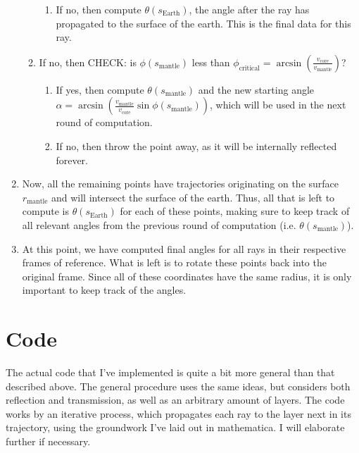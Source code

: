 \documentclass{article}
\newcommand*\te[1]{\text{#1}}
\newcommand*\p[1]{\left(#1\right)}
\newcommand*\f[2]{\frac{#1}{#2}}
\begin{document}
\begin{enumerate}
\begin{enumerate}
\begin{enumerate}
\item If no, then compute $\theta(s_{\te{Earth}})$, the angle after the ray has propagated to the surface of the earth. This is the final data for this ray.
\end{enumerate}
\item If no, then CHECK: is $\phi(s_{\te{mantle}})$ less than $\phi_{\te{critical}}=\arcsin\p{\f{v_{\te{core}}}{v_{\te{mantle}}}}$?
\begin{enumerate}
\item If yes, then compute $\theta(s_{\te{mantle}})$ and the new starting angle $\alpha=\arcsin\p{\f{v_{\te{mantle}}}{v_{\te{core}}}\sin\phi(s_{\te{mantle}})}$, which will be used in the next round of computation.
\item If no, then throw the point away, as it will be internally reflected forever.
\end{enumerate}
\end{enumerate}
\item Now, all the remaining points have trajectories originating on the surface $r_{\te{mantle}}$ and will intersect the surface of the earth. Thus, all that is left to compute is $\theta(s_{\te{Earth}})$ for each of these points, making sure to keep track of all relevant angles from the previous round of computation (i.e. $\theta(s_{\te{mantle}})$).
\item At this point, we have computed final angles for all rays in their respective frames of reference. What is left is to rotate these points back into the original frame. Since all of these coordinates have the same radius, it is only important to keep track of the angles.
\end{enumerate}
\pagebreak
\section{Code}
The actual code that I've implemented is quite a bit more general than that described above. The general procedure uses the same ideas, but considers both reflection and transmission, as well as an arbitrary amount of layers. The code works by an iterative process, which propagates each ray to the layer next in its trajectory, using the groundwork I've laid out in mathematica. I will elaborate further if necessary.
\pagebreak
\end{document}
